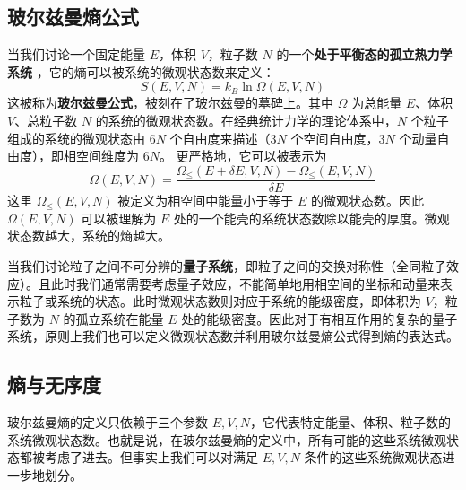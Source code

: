 
\subsection{玻尔兹曼熵公式} 
当我们讨论一个固定能量 $E$，体积 $V$，粒子数 $N$ 的一个\textbf{处于平衡态的孤立热力学系统} ，它的熵可以被系统的微观状态数来定义：
\begin{equation}
S(E,V,N) = k_B \ln \Omega(E,V,N)
\end{equation}
这被称为\textbf{玻尔兹曼公式}，被刻在了玻尔兹曼的墓碑上。其中 $\Omega$ 为总能量 $E$、体积 $V$、总粒子数 $N$ 的系统的微观状态数。在经典统计力学的理论体系中，$N$ 个粒子组成的系统的微观状态由 $6N$ 个自由度来描述（$3N$ 个空间自由度，$3N$ 个动量自由度），即相空间维度为 $6N$。
更严格地，它可以被表示为
\begin{equation}
\Omega(E,V,N)=\frac{\Omega_{\le}(E+\delta E,V,N)-\Omega_{\le}(E,V,N)}{\delta E}
\end{equation}
这里 $\Omega_{\le}(E,V,N)$ 被定义为相空间中能量小于等于 $E$ 的微观状态数。因此 $\Omega(E,V,N)$ 可以被理解为 $E$ 处的一个能壳的系统状态数除以能壳的厚度。微观状态数越大，系统的熵越大。

当我们讨论粒子之间不可分辨的\textbf{量子系统}，即粒子之间的交换对称性（全同粒子效应）。且此时我们通常需要考虑量子效应，不能简单地用相空间的坐标和动量来表示粒子或系统的状态。此时微观状态数则对应于系统的能级密度，即体积为 $V$，粒子数为 $N$ 的孤立系统在能量 $E$ 处的能级密度。因此对于有相互作用的复杂的量子系统，原则上我们也可以定义微观状态数并利用玻尔兹曼熵公式得到熵的表达式。
\subsection{熵与无序度}
玻尔兹曼熵的定义只依赖于三个参数 $E,V,N$，它代表特定能量、体积、粒子数的系统微观状态数。也就是说，在玻尔兹曼熵的定义中，所有可能的这些系统微观状态都被考虑了进去。但事实上我们可以对满足 $E,V,N$ 条件的这些系统微观状态进一步地划分。

